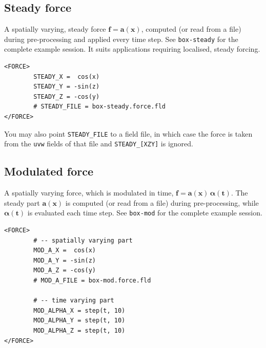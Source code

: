 \documentclass[11pt,a4paper]{report}
\begin{document}
\subsection{Steady force}

A spatially varying, steady force $\bm{f} = \bm{a}(\bm{x})$, computed
(or read from a file) during pre-processing and applied every time
step. See \verb|box-steady| for the complete example session. It suits
applications requiring localised, steady forcing.
\begin{verbatim}
<FORCE>
        STEADY_X =  cos(x)
        STEADY_Y = -sin(z)
        STEADY_Z = -cos(y)
        # STEADY_FILE = box-steady.force.fld
</FORCE>
\end{verbatim}

You may also point \verb+STEADY_FILE+ to a field file, in which case
the force is taken from the \verb+uvw+ fields of that file and
\verb+STEADY_[XZY]+ is ignored.

\subsection{Modulated force}

A spatially varying force, which is modulated in time, $\bm{f} =
\bm{a}(\bm{x}) \, \bm{\alpha(t)} $. The steady part $\bm{a}(\bm{x})$ is
computed (or read from a file) during pre-processing, while
$\bm{\alpha(t)}$ is evaluated each time step. See \verb|box-mod| for
the complete example session.
\begin{verbatim}
<FORCE>
        # -- spatially varying part
        MOD_A_X =  cos(x)
        MOD_A_Y = -sin(z)
        MOD_A_Z = -cos(y)
        # MOD_A_FILE = box-mod.force.fld

        # -- time varying part
        MOD_ALPHA_X = step(t, 10)
        MOD_ALPHA_Y = step(t, 10)
        MOD_ALPHA_Z = step(t, 10)
</FORCE>
\end{verbatim}
\end{document}
